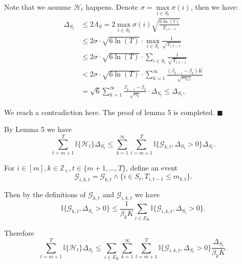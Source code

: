\documentclass[opre,sglanonrev]{informs4}
\begin{document}
\begin{appendices}
Note that we asuume $\mathcal{H}_t$ happens. Denote $\sigma = \mathop{\max}\limits_{i\in S_t}\sigma(i)$, then we have: 
$$\begin{aligned}
\Delta_{S_t} & \leq 2\Lambda_S=2\mathop{\max}\limits_{i\in S_t}\sigma(i)\sqrt{\frac{6\ln(t)}{T_{i,t-1}}}\\
&\leq 2\sigma \cdot \sqrt{6\ln(T)}\cdot \mathop{\max}\limits_{i\in S_t}\frac{1}{\sqrt{T_{i,t-1}}}\\
&\leq 2\sigma \cdot \sqrt{6\ln(T)}\cdot \sum_{i\in S_t}\frac{1}{\sqrt{T_{i,t-1}}}\\
&<2\sigma \cdot \sqrt{6\ln(T)}\cdot \sum_{k=1}^\infty\frac{(\beta_{k-1}-\beta_k)K}{\sqrt{m_{k,t}}}\\
&=\sqrt{6}\sum_{k=1}^\infty\frac{\beta_{k-1}-\beta_k}{\sqrt{\alpha_k}}\cdot \Delta_{S_t}\leq\Delta_{S_t},
\end{aligned}$$

We reach a contradiction here. The proof of lemma 5 is completed.
\hfill $\blacksquare$

By Lemma 5 we have
$$\sum_{t=m+1}^T\mathbb{I} \{\mathcal{H}_t\}\Delta_{S_t}\leq\sum_{k=1}^\infty\sum_{t=m+1}^T\mathbb{I}\{\mathcal{G}_{k,t},\Delta_{S_t}>0\}\Delta_{S_t}.$$

For $i\in [m], k\in \mathbb{Z}_+, t\in \{m+1,...,T\}$, define an event
$$\mathcal{G}_{i,k,t}=\mathcal{G}_{k,t}\wedge\{i\in S_t,T_{i,t-1}\leq m_{k,t}\}.$$

Then by the definitions of $\mathcal{G}_{k,t}$ and $\mathcal{G}_{i,k,t}$ we have
$$\mathbb{I}\{\mathcal{G}_{k,t},\Delta_{S_t}>0\}\leq\frac{1}{\beta_kK}\sum_{i\in E_\mathrm{B}}\mathbb{I}\{\mathcal{G}_{i,k,t},\Delta_{S_t}>0\}.$$

Therefore
$$\sum_{t=m+1}^T\mathbb{I}\{\mathcal{H}_t\}\Delta_{S_t}\leq\sum_{i\in E_\mathrm{B}}\sum_{k=1}^\infty\sum_{t=m+1}^T\mathbb{I}\{\mathcal{G}_{i,k,t},\Delta_{S_t}>0\}\frac{\Delta_{S_t}}{\beta_kK}.$$


\end{appendices}
\end{document}

